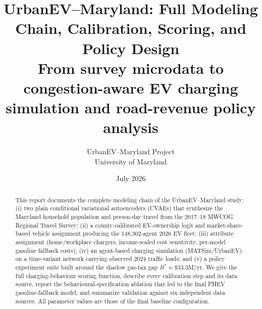 \documentclass[11pt]{article}
\title{\textbf{UrbanEV--Maryland: Full Modeling Chain, Calibration, Scoring, and
Policy Design}\\[4pt]\large From survey microdata to congestion-aware EV charging
simulation and road-revenue policy analysis}
\author{UrbanEV--Maryland Project \\ University of Maryland}
\date{July 2026}
\begin{document}
\maketitle

\begin{abstract}
\noindent This report documents the complete modeling chain of the UrbanEV--Maryland
study: (i) two plain conditional variational autoencoders (CVAEs) that synthesize the
Maryland household population and person-day travel from the 2017--18 MWCOG Regional
Travel Survey; (ii) a county-calibrated EV-ownership logit and market-share-based
vehicle assignment producing the 148{,}302-agent 2026 EV fleet; (iii) attribute
assignment (home/workplace chargers, income-scaled cost sensitivity, per-model
gasoline fallback costs); (iv) an agent-based charging simulation (MATSim/UrbanEV)
on a time-variant network carrying observed 2024 traffic loads; and (v) a policy
experiment suite built around the shadow gas-tax gap $R^{*}\!\approx\!\$33.3$M/yr.
We give the full charging-behaviour scoring function, describe every calibration
step and its data source, report the behavioural-specification ablation that led to
the final PHEV gasoline-fallback model, and summarize validation against six
independent data sources. All parameter values are those of the final baseline
configuration.
\end{abstract}
\end{document}
